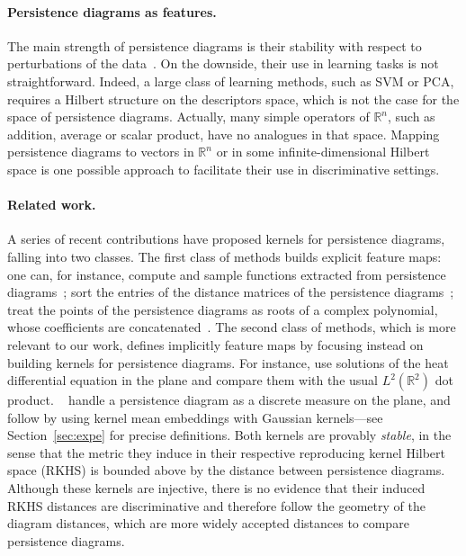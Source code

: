 \documentclass[11pt]{article}
\newcommand{\R}{\mathbb{R}}
\begin{document}
\paragraph{Persistence diagrams as features.} 
The main strength of persistence diagrams is their stability with respect to perturbations of the data~\cite{Chazal09c,Chazal13b}.
On the downside, their use in learning tasks is not straightforward.
Indeed, a large class of learning methods, such as SVM or PCA, requires
a Hilbert structure on the descriptors space, which is not the case
for the space of persistence diagrams. Actually, many simple operators of $\R^n$, such
as addition, average or scalar product, have no analogues in that
space. Mapping persistence diagrams to vectors in $\R^n$ or in some infinite-dimensional Hilbert space 
is one possible approach to facilitate their use in discriminative settings.


\paragraph{Related work.} A series of recent contributions have proposed kernels for persistence diagrams,
falling into two classes.  The first class of methods builds explicit
feature maps: one can, for instance, compute and sample functions extracted from
persistence diagrams~\cite{Bubenik15,Adams17,Robins16}; sort the entries of
the distance matrices of the persistence diagrams~\cite{Carriere15a}; treat the
points of the persistence diagrams as roots of a complex polynomial, whose coefficients are
concatenated~\cite{diFabio15}.
The second class of methods, which is more relevant to our work, defines implicitly feature maps by focusing instead on building kernels for persistence diagrams. For
instance, \cite{Reininghaus15} use
solutions of the heat differential equation in the plane and compare them
with the usual $L^2(\R^2)$ dot product.
~\cite{Kusano16} handle a persistence diagram as a discrete measure on the plane,
and follow by using kernel mean embeddings with Gaussian kernels---see
Section~\ref{sec:expe} for precise definitions.
Both kernels are provably {\em stable}, in the sense that the metric they induce in their respective reproducing kernel Hilbert space (RKHS) 
is bounded above by the distance between persistence diagrams. 
Although these kernels are injective, there is no evidence that their induced RKHS distances are discriminative and therefore follow 
the geometry of the diagram distances, which are more widely accepted distances to compare persistence diagrams.
\end{document}
